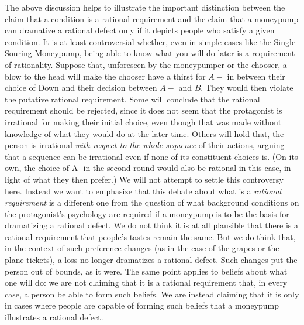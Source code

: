 \documentclass[11pt]{article}
\theoremstyle{definition}
\theoremstyle{definition}
\begin{document}
The above discussion helps to illustrate the important distinction between the claim that a condition is a rational requirement and the claim that a moneypump can dramatize a rational defect only if it depicts people who satisfy a given condition. It is at least controversial whether, even in simple cases like the Single-Souring Moneypump, being able to know what you will do later is a requirement of rationality. Suppose that, unforeseen by the moneypumper or the chooser, a blow to the head will make the chooser have a thirst for $A-$ in between their choice of Down and their decision between $A-$ and $B$. They would then violate the putative rational requirement. Some will conclude that the rational requirement should be rejected, since it does not seem that the protagonist is irrational for making their initial choice, even though that was made without knowledge of what they would do at the later time. Others will hold that, the person is irrational \emph{with respect to the whole sequence} of their actions, arguing that a sequence can be irrational even if none of its constituent choices is. (On its own, the choice of A- in the second round would also be rational in this case, in light of what they then prefer.) We will not attempt to settle this controversy here. Instead we want to emphasize that this debate about what is a \emph{rational requirement} is a different one from the question of what background conditions on the protagonist's psychology are required if a moneypump is to be the basis for dramatizing a rational defect. We do not think it is at all plausible that there is a rational requirement that people's tastes remain the same. But we do think that, in the context of such preference changes (as in the case of the grapes or the plane tickets), a loss no longer dramatizes a rational defect. Such changes put the person out of bounds, as it were. The same point applies to beliefs about what one will do: we are not claiming that it is a rational requirement that, in every case, a person be able to form such beliefs. We are instead claiming that it is only in cases where people are capable of forming such beliefs that a moneypump illustrates a rational defect.

\end{document}
